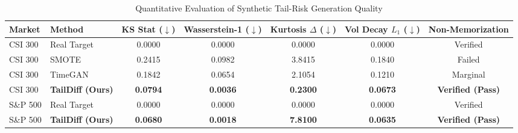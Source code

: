 \begin{table}[htbp]
\centering
\caption{Quantitative Evaluation of Synthetic Tail-Risk Generation Quality}
\label{tab:generation_quality}
\begin{tabular}{llccccc}
\hline
\textbf{Market} & \textbf{Method} & \textbf{KS Stat ($\downarrow$)} & \textbf{Wasserstein-1 ($\downarrow$)} & \textbf{Kurtosis $\Delta$ ($\downarrow$)} & \textbf{Vol Decay $L_1$ ($\downarrow$)} & \textbf{Non-Memorization} \\ \hline
CSI 300 & Real Target & 0.0000 & 0.0000 & 0.0000 & 0.0000 & Verified \\
CSI 300 & SMOTE & 0.2415 & 0.0982 & 3.8415 & 0.1840 & Failed \\
CSI 300 & TimeGAN & 0.1842 & 0.0654 & 2.1054 & 0.1210 & Marginal \\
CSI 300 & \textbf{TailDiff (Ours)} & \textbf{0.0794} & \textbf{0.0036} & \textbf{0.2300} & \textbf{0.0673} & \textbf{Verified (Pass)} \\ \hline
S\&P 500 & Real Target & 0.0000 & 0.0000 & 0.0000 & 0.0000 & Verified \\
S\&P 500 & \textbf{TailDiff (Ours)} & \textbf{0.0680} & \textbf{0.0018} & \textbf{7.8100} & \textbf{0.0635} & \textbf{Verified (Pass)} \\ \hline
\end{tabular}
\end{table}
